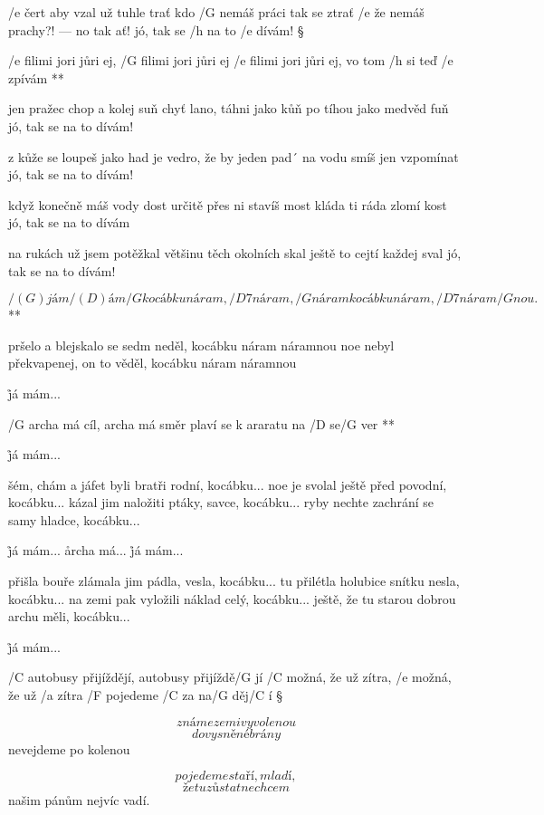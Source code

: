 /e čert aby vzal už tuhle trať
kdo /G nemáš práci tak se ztrať
/e že nemáš prachy?! --- no tak ať!
jó, tak se /h na to /e dívám! \S

\R /e filimi jori jůri ej, /G filimi jori jůri ej
   /e filimi jori jůri ej, vo tom /h si teď /e zpívám **

jen pražec chop a kolej suň
chyť lano, táhni jako kůň
po tíhou jako medvěd fuň
jó, tak se na to dívám! \s

z kůže se loupeš jako had
je vedro, že by jeden pad´
na vodu smíš jen vzpomínat
jó, tak se na to dívám! \s

když konečně máš vody dost
určitě přes ni stavíš most
kláda ti ráda zlomí kost
jó, tak se na to dívám \s

na rukách už jsem potěžkal
většinu těch okolních skal
ještě to cejtí každej sval
jó, tak se na to dívám! \s




\R \[/(G) já m/(D) ám /G kocábku náram, /D7 náram, /G náram
   kocábku náram, /D7 náram/G nou. \]  **

pršelo a blejskalo se sedm neděl, kocábku náram náramnou
noe nebyl překvapenej, on to věděl, kocábku náram náramnou \s

\r já mám...

\R /G archa má cíl, archa má směr
   plaví se k araratu na /D se/G ver **

\r  já mám...

šém, chám a jáfet byli bratři rodní, kocábku...
noe je svolal ještě před povodní, kocábku...
kázal jim naložiti ptáky, savce, kocábku...
ryby nechte zachrání se samy hladce, kocábku... \s

\r  já mám...
\r  archa má...
\r  já mám...

přišla bouře zlámala jim pádla, vesla, kocábku...
tu přilétla holubice snítku nesla, kocábku...
na zemi pak vyložili náklad celý, kocábku...
ještě, že tu starou dobrou archu měli, kocábku... \s

\r  já mám...




/C autobusy přijíždějí, autobusy přijíždě/G jí
/C možná, že už zítra, /e možná, že už /a zítra
/F pojedeme /C za na/G děj/C í \S

\[ známe zemi vyvolenou \]
\[ do vysněné brány \]
nevejdeme po kolenou \s

\[ pojedeme staří, mladí, \]
\[ že tu zůstat nechcem \]
našim pánům nejvíc vadí. \s

